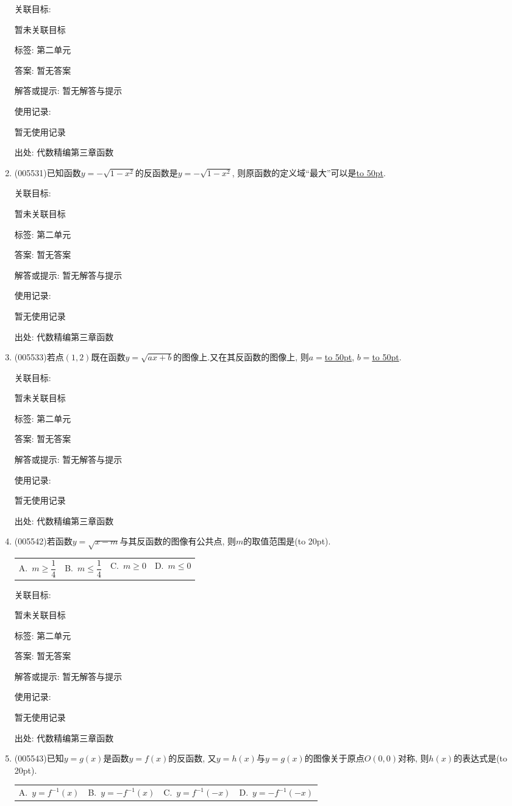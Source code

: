 \documentclass[10pt,a4paper]{article}
\newcommand{\blank}[1]{\underline{\hbox to #1pt{}}}
\newcommand{\bracket}[1]{(\hbox to #1pt{})}
\newcommand{\fourch}[4]{\par\begin{tabular}{p{.23\textwidth}p{.23\textwidth}p{.23\textwidth}p{.23\textwidth}}
A.~#1 &B.~#2& C.~#3& D.~#4
\end{tabular}}
\begin{document}
\begin{enumerate}[1.]
关联目标:

暂未关联目标



标签: 第二单元

答案: 暂无答案

解答或提示: 暂无解答与提示

使用记录:

暂无使用记录


出处: 代数精编第三章函数
\item { (005531)}已知函数$y=-\sqrt {1-x^2}$的反函数是$y=-\sqrt {1-x^2}$, 则原函数的定义域``最大''可以是\blank{50}.


关联目标:

暂未关联目标



标签: 第二单元

答案: 暂无答案

解答或提示: 暂无解答与提示

使用记录:

暂无使用记录


出处: 代数精编第三章函数
\item { (005533)}若点$(1, 2)$既在函数$y=\sqrt {ax+b}$的图像上.又在其反函数的图像上, 则$a=$\blank{50}, $b=$\blank{50}.


关联目标:

暂未关联目标



标签: 第二单元

答案: 暂无答案

解答或提示: 暂无解答与提示

使用记录:

暂无使用记录


出处: 代数精编第三章函数
\item { (005542)}若函数$y=\sqrt {x-m}$与其反函数的图像有公共点, 则$m$的取值范围是\bracket{20}.
\fourch{$m\ge \dfrac 14$}{$m\le \dfrac 14$}{$m\ge 0$}{$m\le 0$}


关联目标:

暂未关联目标



标签: 第二单元

答案: 暂无答案

解答或提示: 暂无解答与提示

使用记录:

暂无使用记录


出处: 代数精编第三章函数
\item { (005543)}已知$y=g(x)$是函数$y=f(x)$的反函数, 又$y=h(x)$与$y=g(x)$的图像关于原点$O(0,0)$对称, 则$h(x)$的表达式是\bracket{20}.
\fourch{$y=f^{-1}(x)$}{$y=-f^{-1}(x)$}{$y=f^{-1}(-x)$}{$y=-f^{-1}(-x)$}



\end{enumerate}
\end{document}
